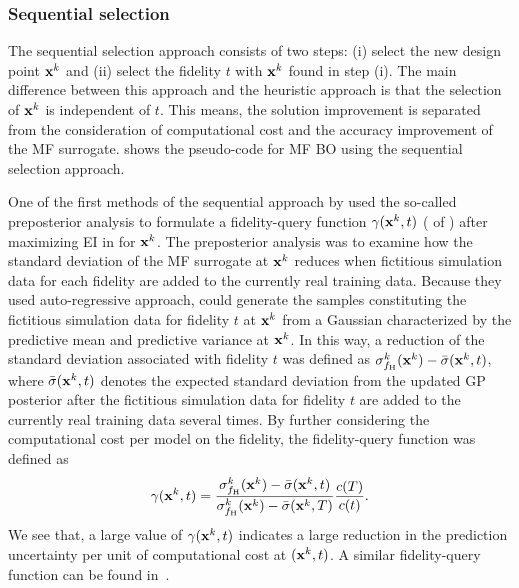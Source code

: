 \documentclass[iicol,sn-basic]{sn-jnl}%
\begin{document}
\subsubsection{Sequential selection}\label{Sec523}

The sequential selection approach consists of two steps: (i) select the new design point ${\bf x}^k$ and (ii) select the fidelity $t$ with ${\bf x}^k$ found in step (i).
The main difference between this approach and the heuristic approach is that the selection of ${\bf x}^k$ is independent of $t$.
This means, the solution improvement is separated from the consideration of computational cost and the accuracy improvement of the MF surrogate.
 shows the pseudo-code for MF BO using the sequential selection approach.

One of the first methods of the sequential approach by \cite{Chen2016} used the so-called preposterior analysis to formulate a fidelity-query function $\gamma({\bf x}^k,t)$ ( of ) after maximizing EI in  for ${\bf x}^k$.
The preposterior analysis was to examine how the standard deviation of the MF surrogate at ${\bf x}^k$ reduces when fictitious simulation data for each fidelity are added to the currently real training data.
Because they used auto-regressive approach, \cite{Chen2016} could generate the samples constituting the fictitious simulation data for fidelity $t$ at ${\bf x}^k$ from a Gaussian characterized by the predictive mean and predictive variance at ${\bf x}^k$.
In this way, a reduction of the standard deviation associated with fidelity $t$ was defined as $\sigma_{f_\text{H}}^k({\bf x}^k)-\bar{\sigma}({\bf x}^k,t)$, where $\bar{\sigma}({\bf x}^k,t)$ denotes the expected standard deviation from the updated GP posterior after the fictitious simulation data for fidelity $t$ are added to the currently real training data several times.
By further considering the computational cost per model on the fidelity, the fidelity-query function was defined as
\begin{equation}\label{eqn57}
    \gamma({\bf x}^k,t) = \frac{\sigma_{f_\text{H}}^k({\bf x}^k)-\bar{\sigma}({\bf x}^k,t)}{\sigma_{f_\text{H}}^k({\bf x}^k)-\bar{\sigma}({\bf x}^k,T)} \frac{c(T)}{c(t)}.
\end{equation}
We see that, a large value of $\gamma({\bf x}^k,t)$ indicates a large reduction in the prediction uncertainty per unit of computational cost at $({\bf x}^k,t)$.
A similar fidelity-query function can be found in~\cite{Tran2020jcp,Tran2020cise}.
\end{document}
